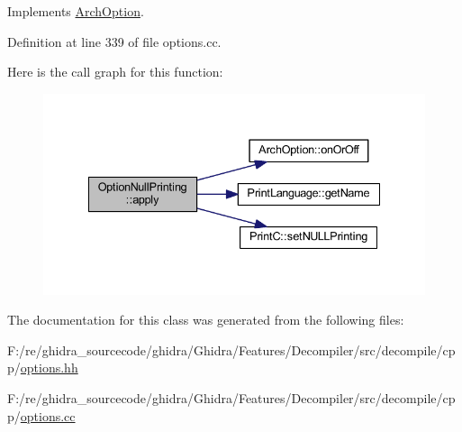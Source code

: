 Implements \mbox{\hyperlink{class_arch_option_a5dc1b3adaee0d11e6018b85640272498}{Arch\+Option}}.



Definition at line 339 of file options.\+cc.

Here is the call graph for this function\+:
\nopagebreak
\begin{figure}[H]
\begin{center}
\leavevmode
\includegraphics[width=335pt]{class_option_null_printing_ac2cdd4d12779b79894c3449d8d601110_cgraph}
\end{center}
\end{figure}


The documentation for this class was generated from the following files\+:\begin{DoxyCompactItemize}
\item 
F\+:/re/ghidra\+\_\+sourcecode/ghidra/\+Ghidra/\+Features/\+Decompiler/src/decompile/cpp/\mbox{\hyperlink{options_8hh}{options.\+hh}}\item 
F\+:/re/ghidra\+\_\+sourcecode/ghidra/\+Ghidra/\+Features/\+Decompiler/src/decompile/cpp/\mbox{\hyperlink{options_8cc}{options.\+cc}}\end{DoxyCompactItemize}
